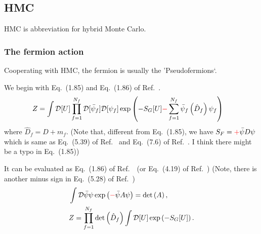 \subsection{\label{hmc}HMC}

HMC is abbreviation for hybrid Monte Carlo.

\subsubsection{\label{hmc_scheme}The fermion action}

Cooperating with HMC, the fermion is usually the 'Pseudofermions`.

We begin with Eq.~(1.85) and Eq.~(1.86) of Ref.~\cite{latticeqcdbook2017}.
\begin{equation}
\begin{split}
&Z=\int \mathcal{D}[U] \prod _{f=1}^{N_f} \mathcal {D}[\bar{\psi}_f]\mathcal {D}[\psi _f]\exp \left(-S_G[U]\textcolor[rgb]{1,0,0}{-}\sum _{f=1}^{N_f}\bar{\psi} _f\left(\hat{D}_f\right)\psi _f\right)
\end{split}
\end{equation}
where $\hat{D}_f=D+m_f$. (Note that, different from Eq.~(1.85), we have $S_F=\textcolor[rgb]{1,0,0}{+}\bar{\psi}D\psi$ which is same as Eq.~(5.39) of Ref.~\cite{latticeqcdbook2010} and Eq.~(7.6) of Ref.~\cite{latticeqcdbook1998}. I think there might be a typo in Eq.~(1.85))

It can be evaluated as Eq.~(1.86) of Ref.~\cite{latticeqcdbook2017}~(or Eq.~(4.19) of Ref.~\cite{condensedmatterbookAltland}) (Note, there is another minus sign in Eq.~(5.28) of Ref.~\cite{latticeqcdbook2010})
\begin{equation}
\begin{split}
&\int \mathcal{D}{\bar{\psi}}\psi \exp \left(\textcolor[rgb]{1,0,0}{-}\bar{\psi}A\psi\right)=\det \left(A\right),\\
&Z=\prod _{f=1}^{N_f} \det \left(\hat{D}_f\right)\int \mathcal{D}[U] \exp \left(-S_G[U]\right).\\
\end{split}
\end{equation}

